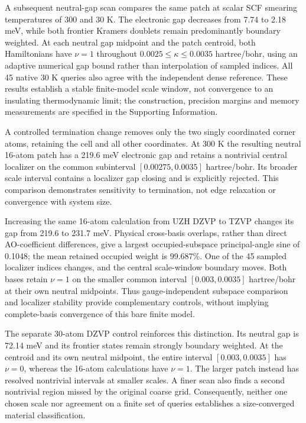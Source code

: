 A subsequent neutral-gap scan compares the same patch at scalar SCF
smearing temperatures of 300 and 30 K. The electronic gap decreases
from 7.74 to 2.18 meV, while both frontier Kramers doublets remain
predominantly boundary weighted. At each neutral gap midpoint and
the patch centroid, both Hamiltonians have $\nu=1$ throughout
$0.0025\leq\kappa\leq0.0035$ hartree/bohr, using an adaptive
numerical gap bound rather than interpolation of sampled indices.
All 45 native 30 K queries also agree with the independent dense
reference. These results establish a stable finite-model scale
window, not convergence to an insulating thermodynamic limit;
the construction, precision margins and memory measurements are
specified in the Supporting Information.

A controlled termination change removes only the two singly
coordinated corner atoms, retaining the cell and all other coordinates.
At 300 K the resulting neutral 16-atom patch has a 219.6 meV
electronic gap and retains a nontrivial central localizer on the
common subinterval $[0.00275,0.0035]$ hartree/bohr. Its broader
scale interval contains a localizer gap closing and is explicitly
rejected. This comparison demonstrates sensitivity to termination,
not edge relaxation or convergence with system size.

Increasing the same 16-atom calculation from UZH DZVP to TZVP
changes its gap from 219.6 to 231.7 meV. Physical cross-basis
overlaps, rather than direct AO-coefficient differences, give a
largest occupied-subspace principal-angle sine of 0.1048; the
mean retained occupied weight is 99.687\%. One of the 45 sampled
localizer indices changes, and the central scale-window boundary
moves. Both bases retain $\nu=1$ on the smaller common interval
$[0.003,0.0035]$ hartree/bohr at their own neutral midpoints.
Thus gauge-independent subspace comparison and localizer stability
provide complementary controls, without implying complete-basis
convergence of this bare finite model.

\begingroup{}
The separate 30-atom DZVP control reinforces this distinction.
Its neutral gap is 72.14 meV and its frontier states remain
strongly boundary weighted. At the centroid and its own neutral
midpoint, the entire interval $[0.003,0.0035]$ has $\nu=0$,
whereas the 16-atom calculations have $\nu=1$. The larger patch
instead has resolved nontrivial intervals at smaller scales.
A finer scan also finds a second nontrivial region missed by the
original coarse grid. Consequently, neither one chosen scale
nor agreement on a finite set of queries establishes a
size-converged material classification.\par
\endgroup

